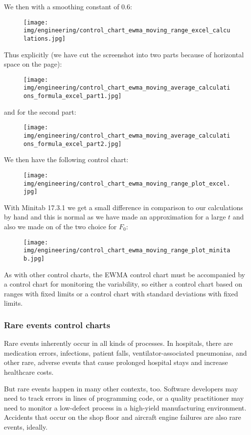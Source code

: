 	We then with a smoothing constant of $0.6$:
	\begin{figure}[H]
		\centering
		\texttt{[image: img/engineering/control\_chart\_ewma\_moving\_range\_excel\_calculations.jpg]}
	\end{figure}
	Thus explicitly (we have cut the screenshot into two parts because of horizontal space on the page):
	\begin{figure}[H]
		\centering
		\texttt{[image: img/engineering/control\_chart\_ewma\_moving\_average\_calculations\_formula\_excel\_part1.jpg]}
	\end{figure}
	and for the second part:
	\begin{figure}[H]
		\centering
		\texttt{[image: img/engineering/control\_chart\_ewma\_moving\_average\_calculations\_formula\_excel\_part2.jpg]}
	\end{figure}
	We then have the following control chart:
	\begin{figure}[H]
		\centering
		\texttt{[image: img/engineering/control\_chart\_ewma\_moving\_range\_plot\_excel.jpg]}
	\end{figure}
	With Minitab 17.3.1 we get a small difference in comparison to our calculations by hand and this is normal as we have made an approximation for a large $t$ and also we made on of the two choice for $F_0$:
	\begin{figure}[H]
		\centering
		\texttt{[image: img/engineering/control\_chart\_ewma\_moving\_range\_plot\_minitab.jpg]}
	\end{figure}
	As with other control charts, the EWMA control chart must be accompanied by a control chart for monitoring the variability, so either a control chart based on ranges with fixed limits or a control chart with standard deviations with fixed limits.
	
	\subsubsection{Rare events control charts}
	Rare events inherently occur in all kinds of processes. In hospitals, there are medication errors, infections, patient falls, ventilator-associated pneumonias, and other rare, adverse events that cause prolonged hospital stays and increase healthcare costs. 

	But rare events happen in many other contexts, too. Software developers may need to track errors in lines of programming code, or a quality practitioner may need to monitor a low-defect process in a high-yield manufacturing environment. Accidents that occur on the shop floor and aircraft engine failures are also rare events, ideally.

